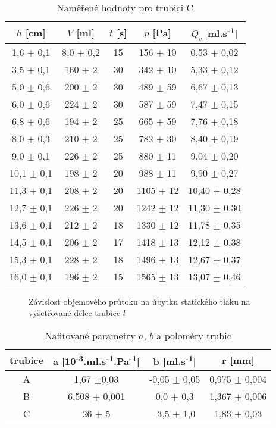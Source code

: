 \begin{table}[htbp]
\centering
\begin{tabular}{|ccccc|}
\hline
$h$ [cm] & $V$ [ml] & $t$ [s] & $p$ [Pa] & $Q_v~$[ml.s\textsuperscript{-1}] \\ \hline
1,6 $\pm$ 0,1 & 8,0 $\pm$ 0,2 & 15 & 156 $\pm$ 10 & 0,53 $\pm$ 0,02 \\ 
3,5 $\pm$ 0,1 & 160 $\pm$ 2 & 30 & 342 $\pm$ 10 & 5,33 $\pm$ 0,12 \\ 
5,0 $\pm$ 0,6 & 200 $\pm$ 2 & 30 & 489 $\pm$ 59 & 6,67 $\pm$ 0,13 \\ 
6,0 $\pm$ 0,6 & 224 $\pm$ 2 & 30 & 587 $\pm$ 59 & 7,47 $\pm$ 0,15 \\ 
6,8 $\pm$ 0,6 & 194 $\pm$ 2 & 25 & 665 $\pm$ 59 & 7,76 $\pm$ 0,18 \\ 
8,0 $\pm$ 0,3 & 210 $\pm$ 2 & 25 & 782 $\pm$ 30 & 8,40 $\pm$ 0,19 \\ 
9,0 $\pm$ 0,1 & 226 $\pm$ 2 & 25 & 880 $\pm$ 11 & 9,04 $\pm$ 0,20 \\ 
10,1 $\pm$ 0,1 & 198 $\pm$ 2 & 20 & 988 $\pm$ 11 & 9,90 $\pm$ 0,27 \\ 
11,3 $\pm$ 0,1 & 208 $\pm$ 2 & 20 & 1105 $\pm$ 12 & 10,40 $\pm$ 0,28 \\ 
12,7 $\pm$ 0,1 & 226 $\pm$ 2 & 20 & 1242 $\pm$ 12 & 11,30 $\pm$ 0,30 \\ 
13,6 $\pm$ 0,1 & 212 $\pm$ 2 & 18 & 1330 $\pm$ 12 & 11,78 $\pm$ 0,35 \\ 
14,5 $\pm$ 0,1 & 206 $\pm$ 2 & 17 & 1418 $\pm$ 13 & 12,12 $\pm$ 0,38 \\ 
15,3 $\pm$ 0,1 & 228 $\pm$ 2 & 18 & 1496 $\pm$ 13 & 12,67 $\pm$ 0,37 \\ 
16,0 $\pm$ 0,1 & 196 $\pm$ 2 & 15 & 1565 $\pm$ 13 & 13,07 $\pm$ 0,46 \\   \hline
\end{tabular}
\caption{Naměřené hodnoty pro trubici C}
\label{tab:vysledkyC}
\end{table}


\begin{figure}[htbp] 
\centering

\caption{Závislost objemového průtoku na úbytku statického tlaku na vyšetřované délce trubice $l$}
\label{graf:Qv_na_p}
\end{figure}

\begin{table}[htbp]
\centering
\begin{tabular}{|cccc|} \hline
trubice & a [10\textsuperscript{-3}.ml.s\textsuperscript{-1}.Pa\textsuperscript{-1}] & b [ml.s\textsuperscript{-1}] & r [mm] \\ \hline
A & 1,67 $\pm$0,03  & -0,05 $\pm$ 0,05 & 0,975 $\pm$ 0,004\\ 
B & 6,508 $\pm$ 0,001 & 0,0 $\pm$ 0,3 & 1,367 $\pm$ 0,006 \\ 
C & 26 $\pm$ 5 & -3,5 $\pm$ 1,0 & 1,83 $\pm$ 0,03 \\  \hline
\end{tabular} 
\caption{Nafitované parametry $a$, $b$ a poloměry trubic}
\label{tab:fit}
\end{table}

